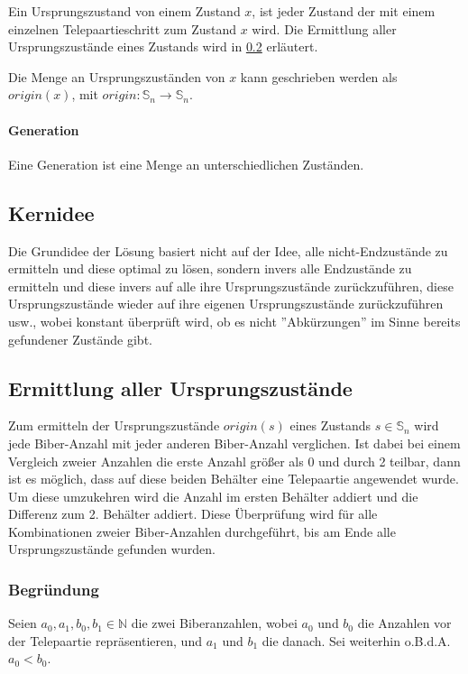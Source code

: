 \documentclass[a4paper,10pt,ngerman]{scrartcl}
\begin{document}
Ein Ursprungszustand von einem Zustand \(x\), ist jeder Zustand der mit einem einzelnen Telepaartieschritt zum Zustand \(x\) wird. Die Ermittlung aller Ursprungszustände eines Zustands wird in \cref{alg:origin} erläutert.

Die Menge an Ursprungszuständen von \(x\) kann geschrieben werden als \(origin(x)\), mit \(origin : \mathbb{S}_n \to \mathbb{S}_n \).

\paragraph{Generation} \label{def:generation}

Eine Generation ist eine Menge an unterschiedlichen Zuständen.

\subsection{Kernidee}

Die Grundidee der Lösung basiert nicht auf der Idee, alle nicht-Endzustände zu ermitteln und diese optimal zu lösen, sondern invers alle Endzustände zu ermitteln und diese invers auf alle ihre Ursprungszustände zurückzuführen, diese Ursprungszustände wieder auf ihre eigenen Ursprungszustände zurückzuführen usw., wobei konstant überprüft wird, ob es nicht ''Abkürzungen'' im Sinne bereits gefundener Zustände gibt.

\subsection{Ermittlung aller Ursprungszustände} \label{alg:origin}

Zum ermitteln der Ursprungszustände \(origin(s)\) eines Zustands \(s \in \mathbb{S}_n\) wird jede Biber-Anzahl mit jeder anderen Biber-Anzahl verglichen. Ist dabei bei einem Vergleich zweier Anzahlen die erste Anzahl größer als 0 und durch 2 teilbar, dann ist es möglich, dass auf diese beiden Behälter eine Telepaartie angewendet wurde. Um diese umzukehren wird die Anzahl im ersten Behälter addiert und die Differenz zum 2. Behälter addiert.
Diese Überprüfung wird für alle Kombinationen zweier Biber-Anzahlen durchgeführt, bis am Ende alle Ursprungszustände gefunden wurden.

\subsubsection{Begründung}

Seien \(a_0, a_1, b_0, b_1 \in \mathbb{N}\) die zwei Biberanzahlen, wobei \(a_0\) und \(b_0\) die Anzahlen vor der Telepaartie repräsentieren, und \(a_1\) und \(b_1\) die danach. Sei weiterhin o.B.d.A. \(a_0 < b_0\).
\end{document}
